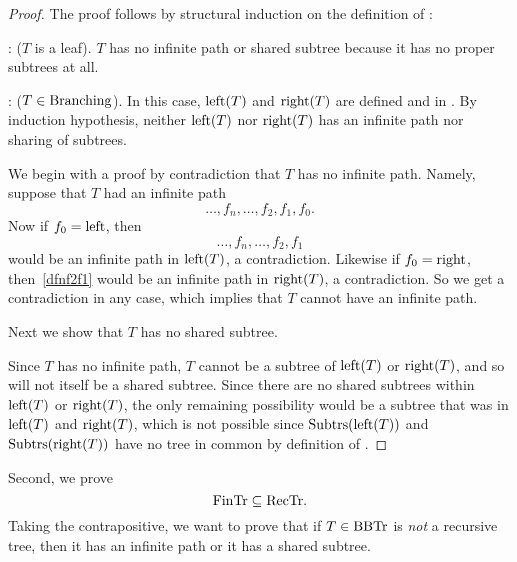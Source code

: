 \begin{proof}
The proof follows by structural induction on the
definition of \rectr:

: ($T$ is a leaf).  $T$ has no infinite path
or shared subtree because it has no proper subtrees at all.

: ($T \in \text{Branching}$).  In this case,
$\text{left}(T)$ and $\text{right}(T)$ are defined and in \rectr.  By
induction hypothesis, neither $\text{left}(T)$ nor $\text{right}(T)$ has an
infinite path nor sharing of subtrees.

We begin with a proof by contradiction that $T$ has no infinite path.
Namely, suppose that $T$ had an infinite path
\[
\dots,f_n,\dots, f_2,f_1,f_0.
\]
Now if $f_0 = \leftsub$, then
\begin{equation}\label{dfnf2f1}
\dots,f_n,\dots,f_2,f_1
\end{equation}
would be an infinite path in $\text{left}(T)$, a contradiction.  Likewise
if $f_0 = \rightsub$, then~\eqref{dfnf2f1} would be an infinite path
in $\text{right}(T)$, a contradiction.  So we get a contradiction in any
case, which implies that $T$ cannot have an infinite path.

Next we show that $T$ has no shared subtree.

Since $T$ has no infinite path, $T$ cannot be a subtree of
$\text{left}(T)$ or $\text{right}(T)$, and so will not itself be a
shared subtree.  Since there are no shared subtrees within
$\text{left}(T)$ or $\text{right}(T)$, the only remaining possibility
would be a subtree that was in $\text{left}(T)$ and $\text{right}(T)$,
which is not possible since $\text{Subtrs}(\text{left}(T))$ and
$\text{Subtrs}(\text{right}(T))$ have no tree in common by definition of
\rectr.
\end{proof}

Second, we prove
\begin{equation}\label{fintrsubrectr}
\text{FinTr} \subseteq \text{RecTr}.
\end{equation}
Taking the contrapositive, we want to prove that if $T \in \text{BBTr}$ is
\emph{not} a recursive tree, then it has an infinite path or it has a
shared subtree.

